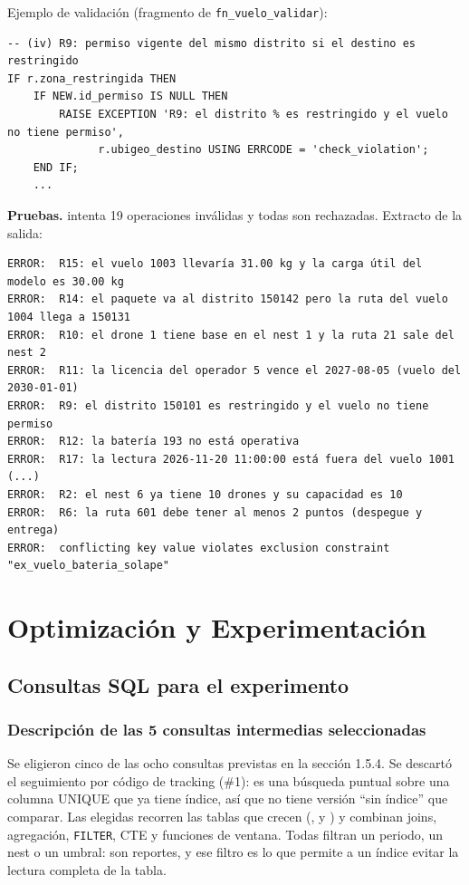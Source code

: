 Ejemplo de validación (fragmento de \texttt{fn\_vuelo\_validar}):
\begin{lstlisting}[style=sql]
-- (iv) R9: permiso vigente del mismo distrito si el destino es restringido
IF r.zona_restringida THEN
    IF NEW.id_permiso IS NULL THEN
        RAISE EXCEPTION 'R9: el distrito % es restringido y el vuelo no tiene permiso',
              r.ubigeo_destino USING ERRCODE = 'check_violation';
    END IF;
    ...
\end{lstlisting}

\textbf{Pruebas.}  intenta 19 operaciones inválidas y todas son rechazadas. Extracto de la salida:
\begin{lstlisting}[style=salida]
ERROR:  R15: el vuelo 1003 llevaría 31.00 kg y la carga útil del modelo es 30.00 kg
ERROR:  R14: el paquete va al distrito 150142 pero la ruta del vuelo 1004 llega a 150131
ERROR:  R10: el drone 1 tiene base en el nest 1 y la ruta 21 sale del nest 2
ERROR:  R11: la licencia del operador 5 vence el 2027-08-05 (vuelo del 2030-01-01)
ERROR:  R9: el distrito 150101 es restringido y el vuelo no tiene permiso
ERROR:  R12: la batería 193 no está operativa
ERROR:  R17: la lectura 2026-11-20 11:00:00 está fuera del vuelo 1001 (...)
ERROR:  R2: el nest 6 ya tiene 10 drones y su capacidad es 10
ERROR:  R6: la ruta 601 debe tener al menos 2 puntos (despegue y entrega)
ERROR:  conflicting key value violates exclusion constraint "ex_vuelo_bateria_solape"
\end{lstlisting}

\newpage
\section{Optimización y Experimentación}

\subsection{Consultas SQL para el experimento}

\subsubsection{Descripción de las 5 consultas intermedias seleccionadas}

Se eligieron cinco de las ocho consultas previstas en la sección 1.5.4. Se descartó el seguimiento por código de tracking (\#1): es una búsqueda puntual sobre una columna UNIQUE que ya tiene índice, así que no tiene versión ``sin índice'' que comparar. Las elegidas recorren las tablas que crecen (,  y ) y combinan joins, agregación, \texttt{FILTER}, CTE y funciones de ventana. Todas filtran un periodo, un nest o un umbral: son reportes, y ese filtro es lo que permite a un índice evitar la lectura completa de la tabla.

